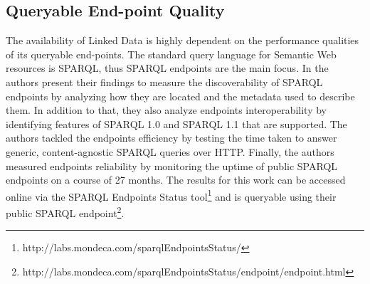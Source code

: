 \documentclass[onecolumn, crcready]{iosart2c}
\begin{document}
\subsection{Queryable End-point Quality}
The availability of Linked Data is highly dependent on the performance qualities of its queryable end-points. The standard query language for Semantic Web resources is SPARQL, thus SPARQL endpoints are the main focus. In \cite{Buil-Aranda2013} the authors present their findings to measure the discoverability of SPARQL endpoints by analyzing how they are located and the metadata used to describe them. In addition to that, they also analyze endpoints interoperability by identifying features of SPARQL 1.0 and SPARQL 1.1 that are supported. The authors tackled the endpoints efficiency by testing the time taken to answer generic, content-agnostic SPARQL queries over HTTP. Finally, the authors measured endpoints reliability by monitoring the uptime of public SPARQL endpoints on a course of 27 months. The results for this work can be accessed online via the SPARQL Endpoints Status tool\footnote{http://labs.mondeca.com/sparqlEndpointsStatus/} and is queryable using their public SPARQL endpoint\footnote{http://labs.mondeca.com/sparqlEndpointsStatus/endpoint/endpoint.html}.\\



\end{document}
